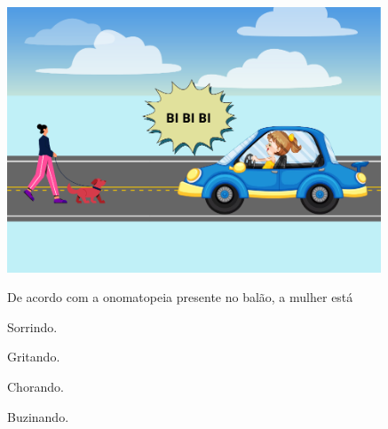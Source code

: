 \includegraphics[width=4.38462in,height=3.11119in]{media/image182.png}


De acordo com a onomatopeia presente no balão, a mulher está

\begin{escolha}
\item Sorrindo.

\item Gritando.

\item Chorando.

\item Buzinando.
\end{escolha}




